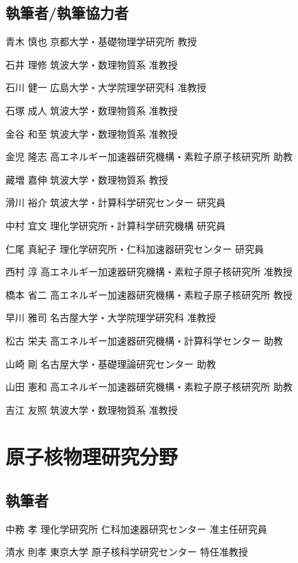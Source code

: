 \begin{執筆者一覧}
\subsection{執筆者/執筆協力者}
\item
{青木 慎也}
{京都大学・基礎物理学研究所}
{教授}
\item
{石井 理修}
{筑波大学・数理物質系}
{准教授}
\item
{石川 健一}
{広島大学・大学院理学研究科}
{准教授}
\item
{石塚 成人}
{筑波大学・数理物質系}
{准教授}
\item
{金谷 和至}
{筑波大学・数理物質系}
{准教授}
\item
{金児 隆志}
{高エネルギー加速器研究機構・素粒子原子核研究所}
{助教}
\item
{藏増 嘉伸}
{筑波大学・数理物質系}
{教授}
\item
{滑川 裕介}
{筑波大学・計算科学研究センター}
{研究員}
\item
{中村 宜文}
{理化学研究所・計算科学研究機構}
{研究員}
\item
{仁尾 真紀子}
{理化学研究所・仁科加速器研究センター}
{研究員}
\item
{西村 淳}
{高エネルギー加速器研究機構・素粒子原子核研究所}
{准教授}
\item
{橋本 省二}
{高エネルギー加速器研究機構・素粒子原子核研究所}
{教授}
\item
{早川 雅司}
{名古屋大学・大学院理学研究科}
{准教授}
\item
{松古 栄夫}
{高エネルギー加速器研究機構・計算科学センター}
{助教}
\item
{山崎 剛}
{名古屋大学・基礎理論研究センター}
{助教}
\item
{山田 憲和}
{高エネルギー加速器研究機構・素粒子原子核研究所}
{助教}
\item
{吉江 友照}
{筑波大学・数理物質系}
{准教授}
\section{原子核物理研究分野}
\subsection{執筆者}
\item
{中務 孝}
{理化学研究所 仁科加速器研究センター}
{准主任研究員}
\item
{清水 則孝}
{東京大学 原子核科学研究センター}
{特任准教授}

\end{執筆者一覧}
